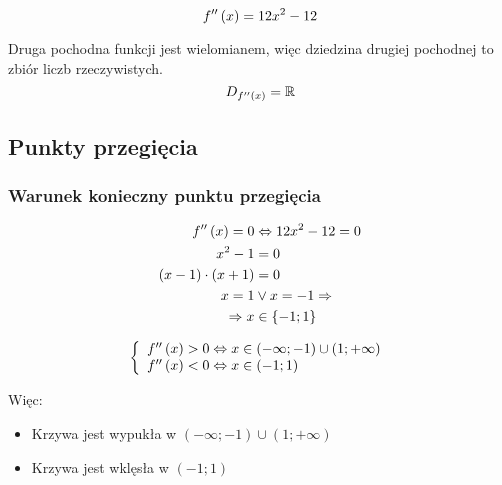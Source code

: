 \documentclass[a4paper,12pt]{article}
\newcommand{\dodx}{
		\ensuremath f'' \left( x \right)
	}
\begin{document}
\[ \dodx = 12x^2 - 12\]

Druga pochodna funkcji jest wielomianem, więc dziedzina drugiej pochodnej to zbiór liczb rzeczywistych.
\[ D_{\dodx} = \mathbb{R} \]

\subsection{Punkty przegięcia}

\subsubsection*{Warunek konieczny punktu przegięcia}

\begin{align*}
	\dodx = 0 &\Leftrightarrow 12x^2 - 12 = 0\\
	x^2 -1 &= 0 \\
	\left( x - 1 \right) \cdot \left( x + 1 \right) &= 0\\
	x = 1 &\vee x = - 1 \Rightarrow \\
	\Rightarrow x &\in \left\{ -1; 1 \right\}
\end{align*}

\begin{figure}[h]
	\centering
\end{figure}

\[\left\{
	\begin{array}{l}
		\dodx > 0 \Leftrightarrow x \in \left( -\infty; -1 \right) \cup \left( 1; +\infty \right)\\
		\dodx < 0 \Leftrightarrow x \in \left( -1; 1 \right)
	\end{array}
\right.
\]

Więc:
\begin{itemize}
	\item Krzywa jest wypukła w $\left( -\infty; -1 \right) \cup \left( 1; +\infty \right)$
	\item Krzywa jest wklęsła w $\left( -1; 1 \right)$

\end{itemize}
\end{document}
